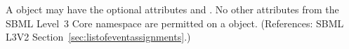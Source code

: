 A \ListOfEventAssignments object may have the optional attributes
  and .  No other attributes from the SBML
Level~3 Core namespace are permitted on a \ListOfEventAssignments object.
(References: SBML L3V2 Section~\ref{sec:listofeventassignments}.)
